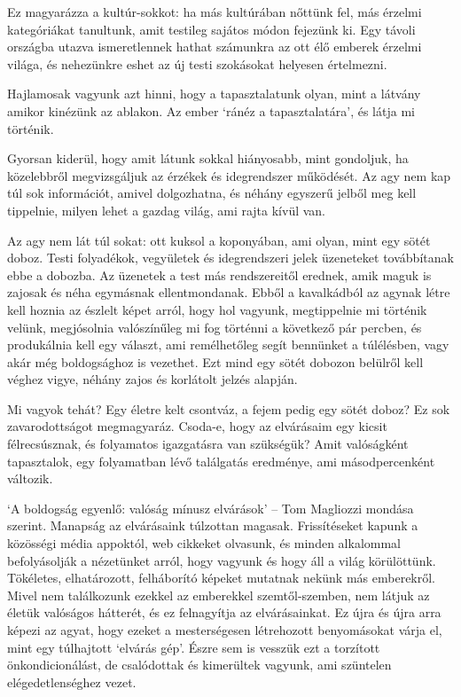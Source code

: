 Ez magyarázza a kultúr-sokkot: ha más kultúrában nőttünk fel, más
érzelmi kategóriákat tanultunk, amit testileg sajátos módon fejezünk ki.
Egy távoli országba utazva ismeretlennek hathat számunkra az ott élő
emberek érzelmi világa, és nehezünkre eshet az új testi szokásokat
helyesen értelmezni.

\enlargethispage*{\baselineskip}

Hajlamosak vagyunk azt hinni, hogy a tapasztalatunk olyan, mint a
látvány amikor kinézünk az ablakon. Az ember `ránéz a tapasztalatára',
és látja mi történik.

Gyorsan kiderül, hogy amit látunk sokkal hiányosabb, mint gondoljuk, ha
közelebbről megvizsgáljuk az érzékek és idegrendszer működését. Az agy
nem kap túl sok információt, amivel dolgozhatna, és néhány egyszerű
jelből meg kell tippelnie, milyen lehet a gazdag világ, ami rajta kívül
van.

Az agy nem lát túl sokat: ott kuksol a koponyában, ami olyan, mint egy
sötét doboz. Testi folyadékok, vegyületek és idegrendszeri jelek
üzeneteket továbbítanak ebbe a dobozba. Az üzenetek a test más
rendszereitől erednek, amik maguk is zajosak és néha egymásnak
ellentmondanak. Ebből a kavalkádból az agynak létre kell hoznia az
észlelt képet arról, hogy hol vagyunk, megtippelnie mi történik velünk,
megjósolnia valószínűleg mi fog történni a következő pár percben, és
produkálnia kell egy választ, ami remélhetőleg segít bennünket a
túlélésben, vagy akár még boldogsághoz is vezethet. Ezt mind egy sötét
dobozon belülről kell véghez vigye, néhány zajos és korlátolt jelzés
alapján.

Mi vagyok tehát? Egy életre kelt csontváz, a fejem pedig egy sötét
doboz? Ez sok zavarodottságot megmagyaráz. Csoda-e, hogy az elvárásaim
egy kicsit félrecsúsznak, és folyamatos igazgatásra van szükségük? Amit
valóságként tapasztalok, egy folyamatban lévő találgatás eredménye, ami
másodpercenként változik.

`A boldogság egyenlő: valóság mínusz elvárások' -- Tom Magliozzi mondása
szerint. Manapság az elvárásaink túlzottan magasak. Frissítéseket kapunk
a közösségi média appoktól, web cikkeket olvasunk, és minden alkalommal
befolyásolják a nézetünket arról, hogy vagyunk és hogy áll a világ
körülöttünk. Tökéletes, elhatározott, felháborító képeket mutatnak
nekünk más emberekről. Mivel nem találkozunk ezekkel az emberekkel
szemtől-szemben, nem látjuk az életük valóságos hátterét, és ez
felnagyítja az elvárásainkat. Ez újra és újra arra képezi az agyat, hogy
ezeket a mesterségesen létrehozott benyomásokat várja el, mint egy
túlhajtott `elvárás gép'. Észre sem is vesszük ezt a torzított
önkondicionálást, de csalódottak és kimerültek vagyunk, ami szüntelen
elégedetlenséghez vezet.

